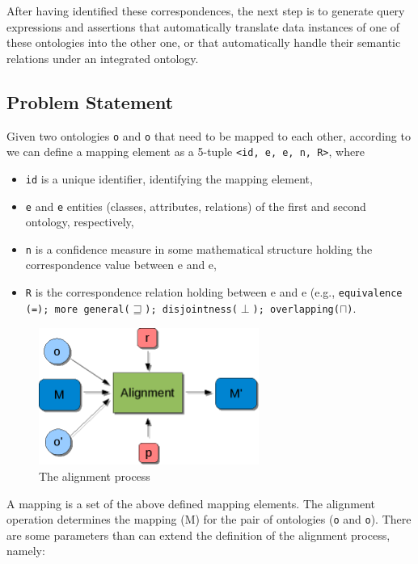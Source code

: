 \documentclass{fast_latex}
\begin{document}
After having identified these correspondences, the next step is to
generate query expressions and assertions that automatically translate
data instances of one of these ontologies into the other one, or that
automatically handle their semantic relations under an integrated
ontology. 

\subsection{Problem Statement}
\label{subsec:mediationproblem_problemstatement}
Given two ontologies \texttt{o} and
\texttt{o{\textquotesingle}} that need to be mapped to
each other, according to \cite{shvaiko2005schema_based} we can define a
mapping element as a 5-tuple \texttt{{\textless}id, e,
e{\textquotesingle}, n, R{\textgreater}}, where 

\begin{itemize}
\item \texttt{id} is a unique identifier, identifying the
mapping element, 
\item \texttt{e} and
\texttt{e{\textquotesingle}} entities (classes,
attributes, relations) of the first and second ontology, respectively, 
\item \texttt{n} is a confidence measure in some
mathematical structure holding the correspondence value between e and
e{\textquotesingle}, 
\item \texttt{R} is the correspondence relation holding
between e and e{\textquotesingle} (e.g.,
\texttt{equivalence (=); more general($\sqsupseteq$); disjointness($\perp$); overlapping($\sqcap$)}.
\end{itemize}

\begin{figure}
    \centering
        \includegraphics[width=72mm, height=45mm]{images/Alignment_process.png}%
        \caption{The alignment process}
    \label{fig:Alignment}
\end{figure}

A mapping is a set of the above defined mapping elements. The alignment
operation determines the mapping
(M\texttt{{\textquotesingle}}) for the pair of ontologies
(\texttt{o} and
\texttt{o{\textquotesingle}}). There are some parameters
than can extend the definition of the alignment process, namely: 
\end{document}
